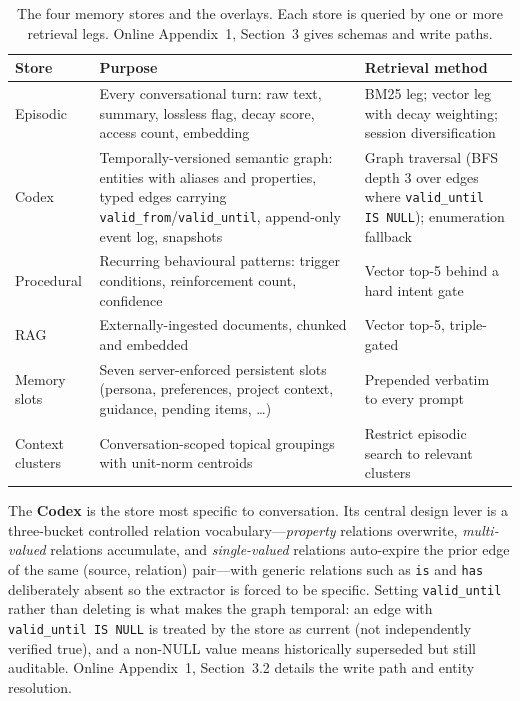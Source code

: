 \documentclass[twoside,11pt]{article}
\begin{document}
\begin{table}[tbp]
\centering
\small


\begin{tabular}{@{}L{2.2cm}L{6.0cm}L{4.4cm}@{}}
\toprule
\textbf{Store} & \textbf{Purpose} & \textbf{Retrieval method} \\
\midrule
Episodic & Every conversational turn: raw text, summary, lossless flag, decay score, access count, embedding & BM25 leg; vector leg with decay weighting; session diversification \\
Codex & Temporally-versioned semantic graph: entities with aliases and properties, typed edges carrying \texttt{valid\_from}/\texttt{valid\_until}, append-only event log, snapshots & Graph traversal (BFS depth 3 over edges where \texttt{valid\_until IS NULL}); enumeration fallback \\
Procedural & Recurring behavioural patterns: trigger conditions, reinforcement count, confidence & Vector top-5 behind a hard intent gate \\
RAG & Externally-ingested documents, chunked and embedded & Vector top-5, triple-gated \\
\midrule
Memory slots & Seven server-enforced persistent slots (persona, preferences, project context, guidance, pending items, \ldots) & Prepended verbatim to every prompt \\
Context clusters & Conversation-scoped topical groupings with unit-norm centroids & Restrict episodic search to relevant clusters \\
\bottomrule
\end{tabular}
\caption{The four memory stores and the overlays. Each store is queried by one or more retrieval legs. Online Appendix~1, Section~3 gives schemas and write paths.}
\label{tab:stores}
\end{table}

The \textbf{Codex} is the store most specific to conversation. Its central design lever is a three-bucket controlled relation vocabulary---\emph{property} relations overwrite, \emph{multi-valued} relations accumulate, and \emph{single-valued} relations auto-expire the prior edge of the same (source, relation) pair---with generic relations such as \texttt{is} and \texttt{has} deliberately absent so the extractor is forced to be specific. Setting \texttt{valid\_until} rather than deleting is what makes the graph temporal: an edge with \texttt{valid\_until IS NULL} is treated by the store as current (not independently verified true), and a non-NULL value means historically superseded but still auditable. Online Appendix~1, Section~3.2 details the write path and entity resolution.
\end{document}
